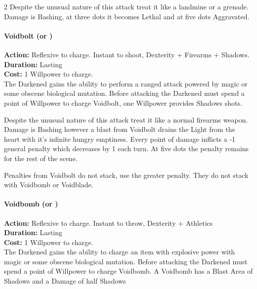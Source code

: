 \begin{multicols}{2}
Despite the unusual nature of this attack treat it like a landmine or a grenade. Damage is Bashing, at three dots it becomes Lethal and at five dots Aggravated.\\

\paragraph*{Voidbolt (\textbullet\textbullet\textbullet or \textbullet\textbullet\textbullet\textbullet\textbullet)}

\noindent \textbf{Action:} Reflexive to charge. Instant to shoot, Dexterity + Firearms + Shadows.\\

\noindent \textbf{Duration:} Lasting \\

\noindent \textbf{Cost:} 1 Willpower to charge.\\

\noindent The Darkened gains the ability to perform a ranged attack powered by magic or some obscene biological mutation. Before attacking the Darkened must spend a point of Willpower to charge Voidbolt, one Willpower provides Shadows shots.

Despite the unusual nature of this attack treat it like a normal firearms weapon. Damage is Bashing however a blast from Voidbolt drains the Light from the heart with it's infinite hungry emptiness. Every point of damage inflicts a -1 general penalty which decreases by 1 each turn. At five dots the penalty remains for the rest of the scene.

Penalties from Voidbolt do not stack, use the greater penalty. They do not stack with Voidbomb or Voidblade.\\

\paragraph*{Voidbomb (\textbullet\textbullet\textbullet or \textbullet\textbullet\textbullet\textbullet\textbullet)}

\noindent \textbf{Action:} Reflexive to charge. Instant to throw, Dexterity + Athletics\\

\noindent \textbf{Duration:} Lasting \\

\noindent \textbf{Cost:} 1 Willpower to charge.\\

\noindent The Darkened gains the ability to charge an item with explosive power with magic or some obscene biological mutation. Before attacking the Darkened must spend a point of Willpower to charge Voidbomb. A Voidbomb has a Blast Area of Shadows and a Damage of half Shadows


\end{multicols}

